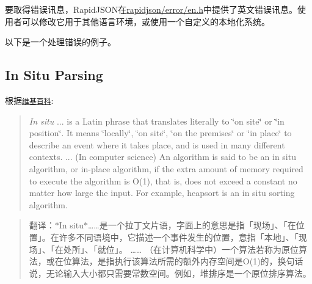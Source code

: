 要取得错误讯息，\+Rapid\+J\+S\+O\+N在{\ttfamily \hyperlink{en_8h_source}{rapidjson/error/en.\+h}}中提供了英文错误讯息。使用者可以修改它用于其他语言环境，或使用一个自定义的本地化系统。

以下是一个处理错误的例子。


\hypertarget{md_Cadriciel_Commun_Externe_RapidJSON_doc_dom.zh-cn_InSituParsing}{}\subsection{In Situ Parsing}\label{md_Cadriciel_Commun_Externe_RapidJSON_doc_dom.zh-cn_InSituParsing}
根据\href{http://en.wikipedia.org/wiki/In_situ}{\tt 维基百科}\+:

\begin{quote}
{\itshape In situ} ... is a Latin phrase that translates literally to \char`\"{}on site\char`\"{} or \char`\"{}in position\char`\"{}. It means \char`\"{}locally\char`\"{}, \char`\"{}on site\char`\"{}, \char`\"{}on the premises\char`\"{} or \char`\"{}in place\char`\"{} to describe an event where it takes place, and is used in many different contexts. ... (In computer science) An algorithm is said to be an in situ algorithm, or in-\/place algorithm, if the extra amount of memory required to execute the algorithm is O(1), that is, does not exceed a constant no matter how large the input. For example, heapsort is an in situ sorting algorithm. \end{quote}


\begin{quote}
翻译：$\ast$\+In situ$\ast$……是一个拉丁文片语，字面上的意思是指「现场」、「在位置」。在许多不同语境中，它描述一个事件发生的位置，意指「本地」、「现场」、「在处所」、「就位」。 …… （在计算机科学中）一个算法若称为原位算法，或在位算法，是指执行该算法所需的额外内存空间是\+O(1)的，换句话说，无论输入大小都只需要常数空间。例如，堆排序是一个原位排序算法。 \end{quote}


